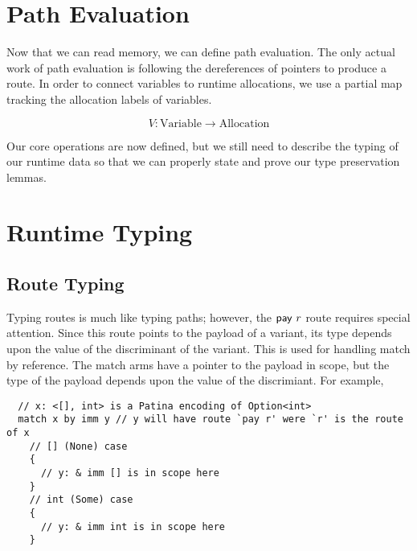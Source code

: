 \section*{Path Evaluation}

Now that we can read memory, we can define path evaluation.
The only actual work of path evaluation is following the dereferences of pointers
to produce a route. In order to connect variables to runtime allocations, we use
a partial map tracking the allocation labels of variables.

$$ V : \mathrm{Variable} \to \mathrm{Allocation} $$



Our core operations are now defined,
but we still need to describe the typing of our runtime data
so that we can properly state and prove our type preservation lemmas.

\section*{Runtime Typing}
\subsection*{Route Typing}
Typing routes is much like typing paths; however, the $\mathsf{pay}~{r}$ route requires
special attention. Since this route points to the payload of a variant,
its type depends upon the value of the discriminant of the variant.
This is used for handling match by reference.
The match arms have a pointer to the payload in scope, but the type of the
payload depends upon the value of the discrimiant.
For example,
\begin{verbatim}
  // x: <[], int> is a Patina encoding of Option<int>
  match x by imm y // y will have route `pay r' were `r' is the route of x
    // [] (None) case
    {
      // y: & imm [] is in scope here
    }
    // int (Some) case
    {
      // y: & imm int is in scope here
    }
\end{verbatim}

